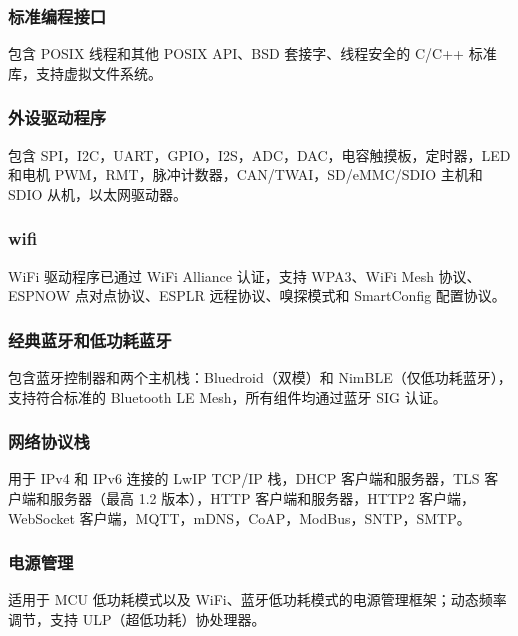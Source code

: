 \documentclass[a4paper,12pt,english]{sphinxmanual}
\begin{document}
\subsubsection{标准编程接口}
\label{\detokenize{dev-board/esp-idf:id6}}
\sphinxAtStartPar
包含 POSIX 线程和其他 POSIX API、BSD 套接字、线程安全的 C/C++ 标准库，支持虚拟文件系统。


\subsubsection{外设驱动程序}
\label{\detokenize{dev-board/esp-idf:id7}}
\sphinxAtStartPar
包含 SPI，I2C，UART，GPIO，I2S，ADC，DAC，电容触摸板，定时器，LED 和电机 PWM，RMT，脉冲计数器，CAN/TWAI，SD/eMMC/SDIO 主机和 SDIO 从机，以太网驱动器。


\subsubsection{wi\sphinxhyphen{}fi}
\label{\detokenize{dev-board/esp-idf:wi-fi}}
\sphinxAtStartPar
Wi\sphinxhyphen{}Fi 驱动程序已通过 Wi\sphinxhyphen{}Fi Alliance 认证，支持 WPA3、Wi\sphinxhyphen{}Fi Mesh 协议、ESP\sphinxhyphen{}NOW 点对点协议、ESP\sphinxhyphen{}LR 远程协议、嗅探模式和 SmartConfig 配置协议。


\subsubsection{经典蓝牙和低功耗蓝牙}
\label{\detokenize{dev-board/esp-idf:id8}}
\sphinxAtStartPar
包含蓝牙控制器和两个主机栈：Bluedroid（双模）和 NimBLE（仅低功耗蓝牙），支持符合标准的 Bluetooth LE Mesh，所有组件均通过蓝牙 SIG 认证。


\subsubsection{网络协议栈}
\label{\detokenize{dev-board/esp-idf:id9}}
\sphinxAtStartPar
用于 IPv4 和 IPv6 连接的 LwIP TCP/IP 栈，DHCP 客户端和服务器，TLS 客户端和服务器（最高 1.2 版本），HTTP 客户端和服务器，HTTP2 客户端，WebSocket 客户端，MQTT，mDNS，CoAP，ModBus，SNTP，SMTP。


\subsubsection{电源管理}
\label{\detokenize{dev-board/esp-idf:id10}}
\sphinxAtStartPar
适用于 MCU 低功耗模式以及 Wi\sphinxhyphen{}Fi、蓝牙低功耗模式的电源管理框架；动态频率调节，支持 ULP（超低功耗）协处理器。
\end{document}
